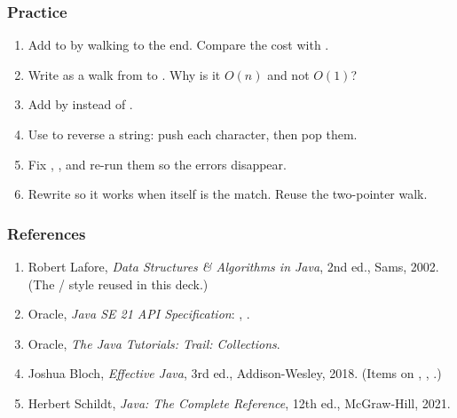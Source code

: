 \documentclass[aspectratio=169,10pt,compress]{beamer}
\begin{document}
\begin{frame}[t,fragile] \frametitle{Practice}
  \begin{enumerate}\small
    \item Add  to  by walking to the
          end. Compare the cost with .
    \item Write  as a walk from  to .
          Why is it $O(n)$ and not $O(1)$?
    \item Add  by  instead of .
    \item Use  to reverse a string: push each character,
          then pop them.
    \item Fix , ,  and re-run them so
          the errors disappear.
    \item Rewrite  so it works when 
          itself is the match. Reuse the two-pointer walk.
  \end{enumerate}
\end{frame}




\begin{frame}[t,fragile] \frametitle{References}
  \begin{enumerate}\small
    \item Robert Lafore, \emph{Data Structures \& Algorithms in Java},
          2nd ed., Sams, 2002. (The  / 
          style reused in this deck.)
    \item Oracle, \emph{Java SE 21 API Specification}:
          ,
          .
    \item Oracle, \emph{The Java Tutorials: Trail: Collections}.
    \item Joshua Bloch, \emph{Effective Java}, 3rd ed., Addison-Wesley,
          2018. (Items on , , .)
    \item Herbert Schildt, \emph{Java: The Complete Reference},
          12th ed., McGraw-Hill, 2021.
  \end{enumerate}
\end{frame}




\begin{frame}[t,fragile]
  \begin{center}
    \vspace{4cm}
  \end{center}
\end{frame}
\end{document}
